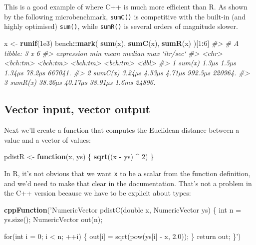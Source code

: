 \documentclass[]{book}
\newenvironment{Shaded}{\begin{snugshade}}{\end{snugshade}}
\newcommand{\CommentTok}[1]{\textcolor[rgb]{0.37,0.37,0.37}{\textit{#1}}}
\newcommand{\ControlFlowTok}[1]{\textcolor[rgb]{0.27,0.27,0.27}{\textbf{#1}}}
\newcommand{\DecValTok}[1]{\textcolor[rgb]{0.06,0.06,0.06}{#1}}
\newcommand{\FloatTok}[1]{\textcolor[rgb]{0.06,0.06,0.06}{#1}}
\newcommand{\KeywordTok}[1]{\textcolor[rgb]{0.27,0.27,0.27}{\textbf{#1}}}
\newcommand{\NormalTok}[1]{#1}
\newcommand{\OperatorTok}[1]{\textcolor[rgb]{0.43,0.43,0.43}{\textbf{#1}}}
\newcommand{\StringTok}[1]{\textcolor[rgb]{0.5,0.5,0.5}{#1}}
\begin{document}
This is a good example of where C++ is much more efficient than R. As shown by the following microbenchmark, \texttt{sumC()} is competitive with the built-in (and highly optimised) \texttt{sum()}, while \texttt{sumR()} is several orders of magnitude slower.

\begin{Shaded}
\begin{Highlighting}[]
\NormalTok{x <-}\StringTok{ }\KeywordTok{runif}\NormalTok{(}\FloatTok{1e3}\NormalTok{)}
\NormalTok{bench}\OperatorTok{::}\KeywordTok{mark}\NormalTok{(}
  \KeywordTok{sum}\NormalTok{(x),}
  \KeywordTok{sumC}\NormalTok{(x),}
  \KeywordTok{sumR}\NormalTok{(x)}
\NormalTok{)[}\DecValTok{1}\OperatorTok{:}\DecValTok{6}\NormalTok{]}
\CommentTok{#> # A tibble: 3 x 6}
\CommentTok{#>   expression      min     mean   median      max `itr/sec`}
\CommentTok{#>   <chr>      <bch:tm> <bch:tm> <bch:tm> <bch:tm>     <dbl>}
\CommentTok{#> 1 sum(x)        1.3µs    1.5µs   1.34µs   78.2µs   667041.}
\CommentTok{#> 2 sumC(x)      3.24µs   4.53µs   4.71µs  992.5µs   220964.}
\CommentTok{#> 3 sumR(x)     38.26µs  40.17µs  38.91µs    1.6ms    24896.}
\end{Highlighting}
\end{Shaded}

\hypertarget{vector-input-vector-output}{%
\subsection{Vector input, vector output}\label{vector-input-vector-output}}

Next we'll create a function that computes the Euclidean distance between a value and a vector of values:

\begin{Shaded}
\begin{Highlighting}[]
\NormalTok{pdistR <-}\StringTok{ }\ControlFlowTok{function}\NormalTok{(x, ys) \{}
  \KeywordTok{sqrt}\NormalTok{((x }\OperatorTok{-}\StringTok{ }\NormalTok{ys) }\OperatorTok{^}\StringTok{ }\DecValTok{2}\NormalTok{)}
\NormalTok{\}}
\end{Highlighting}
\end{Shaded}

In R, it's not obvious that we want \texttt{x} to be a scalar from the function definition, and we'd need to make that clear in the documentation. That's not a problem in the C++ version because we have to be explicit about types:

\begin{Shaded}
\begin{Highlighting}[]
\KeywordTok{cppFunction}\NormalTok{(}\StringTok{'NumericVector pdistC(double x, NumericVector ys) \{}
\StringTok{  int n = ys.size();}
\StringTok{  NumericVector out(n);}

\StringTok{  for(int i = 0; i < n; ++i) \{}
\StringTok{    out[i] = sqrt(pow(ys[i] - x, 2.0));}
\StringTok{  \}}
\StringTok{  return out;}
\StringTok{\}'}\NormalTok{)}
\end{Highlighting}
\end{Shaded}
\end{document}
